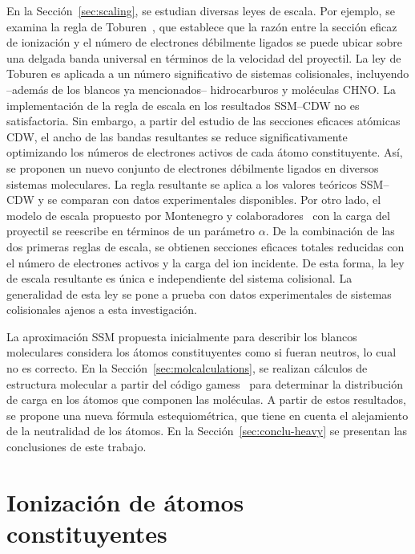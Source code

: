 En la Sección~\ref{sec:scaling}, se estudian diversas leyes de escala. 
Por ejemplo, se examina la regla de Toburen~\cite{Toburen:75,
Toburen:76}, que establece que la razón entre la sección eficaz de 
ionización y el número de electrones débilmente ligados se puede ubicar 
sobre una delgada banda universal en términos de la velocidad del 
proyectil. La ley de Toburen es aplicada a un número significativo de 
sistemas colisionales, incluyendo --además de los blancos ya mencionados-- 
hidrocarburos y moléculas CHNO. La implementación de la regla de escala 
en los resultados SSM--CDW no es satisfactoria. Sin embargo, a partir 
del estudio de las secciones eficaces atómicas CDW, el ancho de las 
bandas resultantes se reduce significativamente optimizando los números 
de electrones activos de cada átomo constituyente. Así, se proponen un 
nuevo conjunto de electrones débilmente ligados en diversos sistemas 
moleculares. La regla resultante se aplica a los valores teóricos 
SSM--CDW y se comparan con datos experimentales disponibles. Por otro 
lado, el modelo de escala propuesto por Montenegro y 
colaboradores~\cite{Dubois:13,Montenegro:13} con la carga del proyectil 
se reescribe en términos de un parámetro $\alpha$. De la combinación de 
las dos primeras reglas de escala, se obtienen secciones eficaces 
totales reducidas con el número de electrones activos y la carga del 
ion incidente. De esta forma, la ley de escala resultante es única e 
independiente del sistema colisional. La generalidad de esta ley se pone 
a prueba con datos experimentales de sistemas colisionales ajenos a esta 
investigación.

La aproximación SSM propuesta inicialmente para describir los blancos 
moleculares considera los átomos constituyentes como si fueran 
neutros, lo cual no es correcto. En la Sección~\ref{sec:molcalculations}, 
se realizan cálculos de estructura molecular a partir del código 
{\sc gamess}~\cite{gamess} para determinar la distribución de carga en 
los átomos que componen las moléculas. A partir de estos resultados, se 
propone una nueva fórmula estequiométrica, que tiene en cuenta el 
alejamiento de la neutralidad de los átomos. 
En la Sección~\ref{sec:conclu-heavy} se presentan las conclusiones de 
este trabajo. 


\section{Ionización de átomos constituyentes}
\label{sec:atoms}


